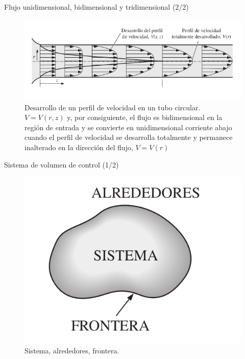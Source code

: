 \begin{frame}{Flujo unidimensional, bidimensional y tridimensional (2/2)}
\justifying
\begin{figure}[H]
\centering
\includegraphics[scale=0.45]{Section_Files/imagenes/sec01_0101_Fig01-23.png}
\caption{Desarrollo de un perfil de velocidad en un tubo circular. $V = V(r, z)$ y, por consiguiente, el flujo es bidimensional en la región de entrada y se convierte en unidimensional corriente abajo cuando el perfil de velocidad se desarrolla totalmente y permanece inalterado en la dirección del flujo, $V = V(r)$}
\label{fig: Figura1-23}
\end{figure}
\end{frame}



	
\begin{frame}{Sistema de volumen de control (1/2)}
\justifying
\begin{figure}[H]
\centering
\includegraphics[scale=0.25]{Section_Files/imagenes/sec01_0101_Fig01-26.png}
\caption{Sistema, alrededores, frontera.}
\label{fig: Figura1-26}
\end{figure}
\end{frame}
	
